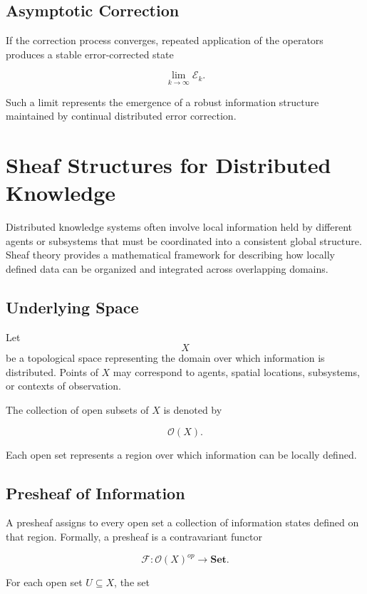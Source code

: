 \documentclass[12pt]{article}
\begin{document}
\subsection{Asymptotic Correction}

If the correction process converges, repeated application of the operators produces a stable error-corrected state

\[
\lim_{k \to \infty} \mathcal{E}_k.
\]

Such a limit represents the emergence of a robust information structure maintained by continual distributed error correction.

\section{Sheaf Structures for Distributed Knowledge}

Distributed knowledge systems often involve local information held by different agents or subsystems that must be coordinated into a consistent global structure. Sheaf theory provides a mathematical framework for describing how locally defined data can be organized and integrated across overlapping domains.

\subsection{Underlying Space}

Let
\[
X
\]
be a topological space representing the domain over which information is distributed. Points of $X$ may correspond to agents, spatial locations, subsystems, or contexts of observation.

The collection of open subsets of $X$ is denoted by

\[
\mathcal{O}(X).
\]

Each open set represents a region over which information can be locally defined.

\subsection{Presheaf of Information}

A presheaf assigns to every open set a collection of information states defined on that region. Formally, a presheaf is a contravariant functor

\[
\mathcal{F} : \mathcal{O}(X)^{op} \rightarrow \mathbf{Set}.
\]

For each open set $U \subseteq X$, the set
\end{document}
